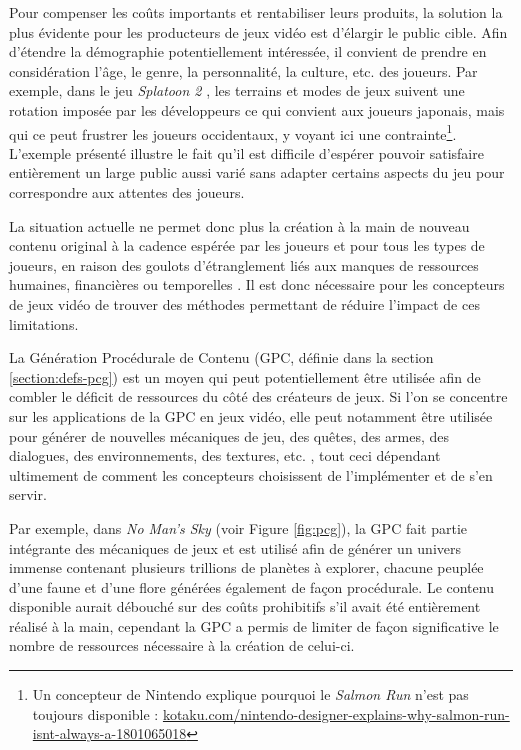 \documentclass[a4paper,11pt]{article}
\begin{document}
      Pour compenser les coûts importants et rentabiliser leurs produits, la solution la plus évidente pour les producteurs de jeux vidéo est d'élargir le public cible.
      Afin d'étendre la démographie potentiellement intéressée, il convient de prendre en considération l'âge, le genre, la personnalité, la culture, etc. des joueurs.
      Par exemple, dans le jeu \textit{Splatoon 2} \cite{game:Splatoon2}, les terrains et modes de jeux suivent une rotation imposée par les développeurs ce qui convient aux joueurs japonais, mais qui ce peut frustrer les joueurs occidentaux, y voyant ici une contrainte\footnote{Un concepteur de Nintendo explique pourquoi le \textit{Salmon Run} n'est pas toujours disponible : \url{kotaku.com/nintendo-designer-explains-why-salmon-run-isnt-always-a-1801065018}}. 
      L'exemple présenté illustre le fait qu'il est difficile d'espérer pouvoir satisfaire entièrement un large public aussi varié sans adapter certains aspects du jeu pour correspondre aux attentes des joueurs.
          
      La situation actuelle ne permet donc plus la création à la main de nouveau contenu original à la cadence espérée par les joueurs et pour tous les types de joueurs, en raison des goulots d'étranglement liés aux manques de ressources humaines, financières ou temporelles \cite{Hendrikx}.
      Il est donc nécessaire pour les concepteurs de jeux vidéo de trouver des méthodes permettant de réduire l'impact de ces limitations.
      
      La Génération Procédurale de Contenu (GPC, définie dans la section \ref{section:defs-pcg}) est un moyen qui peut potentiellement être utilisée afin de combler le déficit de ressources du côté des créateurs de jeux.
      Si l'on se concentre sur les applications de la GPC en jeux vidéo, elle peut notamment être utilisée pour générer de nouvelles mécaniques de jeu, des quêtes, des armes, des dialogues, des environnements, des textures, etc. \cite{Togelius}, tout ceci dépendant ultimement de comment les concepteurs choisissent de l'implémenter et de s'en servir.
      
      Par exemple, dans \textit{No Man's Sky} \cite{game:NoMansSky} (voir Figure \ref{fig:pcg}), la GPC fait partie intégrante des mécaniques de jeux et est utilisé afin de générer un univers immense contenant plusieurs trillions de planètes à explorer, chacune peuplée d'une faune et d'une flore générées également de façon procédurale. 
      Le contenu disponible aurait débouché sur des coûts prohibitifs s'il avait été entièrement réalisé à la main, cependant la GPC a permis de limiter de façon significative le nombre de ressources nécessaire à la création de celui-ci.
\end{document}
